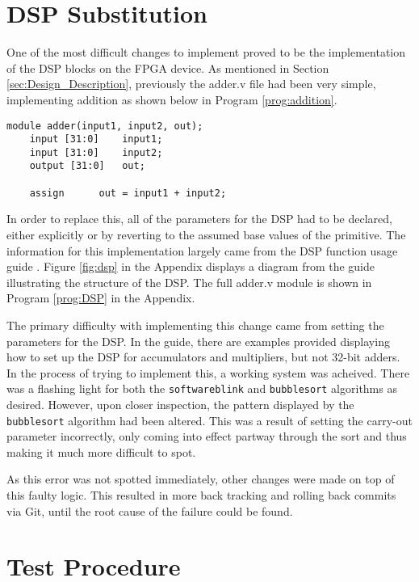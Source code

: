 \documentclass[a4paper,10pt]{article}
\begin{document}
\section*{DSP Substitution}

One of the most difficult changes to implement proved to be the 
implementation of the DSP blocks on the FPGA device.
As mentioned in Section \ref{sec:Design_Description},
previously the adder.v file had been very simple,
implementing addition as shown below in Program \ref{prog:addition}.

\begin{lstlisting}[style=verilog-style, caption=
    {Initial adder.v module}, label={prog:addition}]
module adder(input1, input2, out);
	input [31:0]	input1;
	input [31:0]	input2;
	output [31:0]	out;

	assign		out = input1 + input2;
\end{lstlisting}

In order to replace this, all of the parameters for the DSP had to be declared,
either explicitly or by reverting to the assumed base values of the primitive.
The information for this implementation largely came from the 
DSP function usage guide \cite{DSP_guide}.
Figure \ref{fig:dsp} in the Appendix displays a diagram from the guide 
illustrating the structure of the DSP.
The full adder.v module is shown in Program \ref{prog:DSP}
in the Appendix.

The primary difficulty with implementing this change came from 
setting the parameters for the DSP.
In the guide, there are examples provided displaying how to set up 
the DSP for accumulators and multipliers, but not 32-bit adders.
In the process of trying to implement this,
a working system was acheived.
There was a flashing light for both the \texttt{softwareblink}
and \texttt{bubblesort} algorithms as desired.
However, upon closer inspection, the pattern displayed by 
the \texttt{bubblesort} algorithm had been altered.
This was a result of setting the carry-out parameter incorrectly,
only coming into effect partway through the sort 
and thus making it much more difficult to spot.

As this error was not spotted immediately, 
other changes were made on top of this faulty logic.
This resulted in more back tracking and rolling back commits via Git,
until the root cause of the failure could be found.

\section{Test Procedure}
\label{sec:Test_Procedure}
\end{document}
